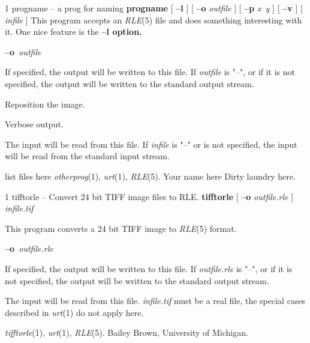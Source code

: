 %
%
%
 1
progname -- a prog for naming
{\bf progname}
[
{\bf --l}
] [
{\bf --o} 
{\it outfile}
] [
{\bf --p}
{\it x\ y}
] [
{\bf --v}
] [ 
{\it infile} 
]
This program accepts an
{\it RLE}{\rm (5)}
file and does something interesting with it.
One nice feature is the %
\bf --l %
\rm option.
\begin{TPlist}{{\bf --o}{\it \ outfile}
}
\item[{{\bf --o}{\it \ outfile}
}]
If specified, the output will be written to this file.  If 
{\it outfile}
is "--", or if it is not specified, the output will be written to the
standard output stream.
\item[{{\bf --p}{\it \ x\ y}
}]
Reposition the image. 
\item[{{\bf --v}}]
Verbose output.
\item[{{\it infile}}]
The input will be read from this file.  If
{\it infile}
is "--" or is not specified, the input will be read from the standard
input stream.
\end{TPlist}
list files here
{\it otherprog}{\rm (1),}
{\it urt}{\rm (1),}
{\it RLE}{\rm (5).}
Your name here
Dirty laundry here.
\newpage


%
%
%
 1
tifftorle -- Convert 24 bit TIFF image files to RLE.
{\bf tifftorle}
[
{\bf --o} 
{\it outfile.rle}
]
{\it infile.tif}

This program converts a 24 bit TIFF image to
{\it RLE}{\rm (5)}
format.
\begin{TPlist}{{\bf --o}{\it \ outfile.rle}
}
\item[{{\bf --o}{\it \ outfile.rle}
}]
If specified, the output will be written to this file.  If 
{\it outfile.rle}
is "--", or if it is not specified, the output will be written to the
standard output stream.
\item[{{\it infile.tif}}]
The input will be read from this file.
{\it infile.tif}
must be a real file, the special cases described in 
{\it urt}{\rm (1)}
do not apply here.
\end{TPlist}
{\it tifftorle}{\rm (1),}
{\it urt}{\rm (1),}
{\it RLE}{\rm (5).}
Bailey Brown, University of Michigan.
\newpage


